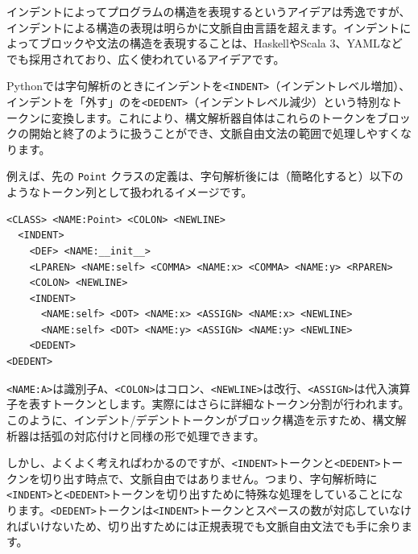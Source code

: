 インデントによってプログラムの構造を表現するというアイデアは秀逸ですが、インデントによる構造の表現は明らかに文脈自由言語を超えます。インデントによってブロックや文法の構造を表現することは、HaskellやScala
3、YAMLなどでも採用されており、広く使われているアイデアです。

Pythonでは字句解析のときにインデントを\texttt{\textless{}INDENT\textgreater{}}（インデントレベル増加）、インデントを「外す」のを\texttt{\textless{}DEDENT\textgreater{}}（インデントレベル減少）という特別なトークンに変換します。これにより、構文解析器自体はこれらのトークンをブロックの開始と終了のように扱うことができ、文脈自由文法の範囲で処理しやすくなります。

例えば、先の \texttt{Point}
クラスの定義は、字句解析後には（簡略化すると）以下のようなトークン列として扱われるイメージです。

\begin{verbatim}
<CLASS> <NAME:Point> <COLON> <NEWLINE>
  <INDENT>
    <DEF> <NAME:__init__>
    <LPAREN> <NAME:self> <COMMA> <NAME:x> <COMMA> <NAME:y> <RPAREN>
    <COLON> <NEWLINE>
    <INDENT>
      <NAME:self> <DOT> <NAME:x> <ASSIGN> <NAME:x> <NEWLINE>
      <NAME:self> <DOT> <NAME:y> <ASSIGN> <NAME:y> <NEWLINE>
    <DEDENT>
<DEDENT>
\end{verbatim}

\texttt{\textless{}NAME:A\textgreater{}}は識別子\texttt{A}、\texttt{\textless{}COLON\textgreater{}}はコロン、\texttt{\textless{}NEWLINE\textgreater{}}は改行、\texttt{\textless{}ASSIGN\textgreater{}}は代入演算子を表すトークンとします。実際にはさらに詳細なトークン分割が行われます。このように、インデント/デデントトークンがブロック構造を示すため、構文解析器は括弧の対応付けと同様の形で処理できます。

しかし、よくよく考えればわかるのですが、\texttt{\textless{}INDENT\textgreater{}}トークンと\texttt{\textless{}DEDENT\textgreater{}}トークンを切り出す時点で、文脈自由ではありません。つまり、字句解析時に\texttt{\textless{}INDENT\textgreater{}}と\texttt{\textless{}DEDENT\textgreater{}}トークンを切り出すために特殊な処理をしていることになります。\texttt{\textless{}DEDENT\textgreater{}}トークンは\texttt{\textless{}INDENT\textgreater{}}トークンとスペースの数が対応していなければいけないため、切り出すためには正規表現でも文脈自由文法でも手に余ります。

